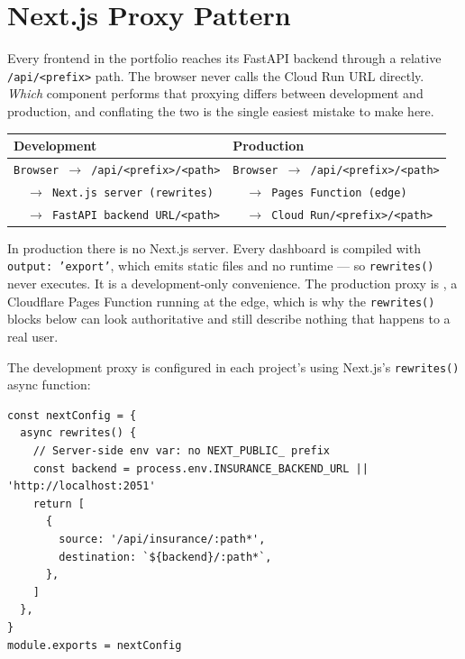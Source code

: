 \section{Next.js Proxy Pattern}
\label{sec:infra-proxy}


Every frontend in the portfolio reaches its FastAPI backend through a relative
\texttt{/api/<prefix>} path. The browser never calls the Cloud Run URL directly.
\emph{Which} component performs that proxying differs between development and
production, and conflating the two is the single easiest mistake to make here.

\begin{center}
\begin{tabular}{ll}
\toprule
\textbf{Development} & \textbf{Production} \\
\midrule
\texttt{Browser $\to$ /api/<prefix>/<path>} & \texttt{Browser $\to$ /api/<prefix>/<path>} \\
\texttt{$\quad\to$ Next.js server (rewrites)} & \texttt{$\quad\to$ Pages Function (edge)} \\
\texttt{$\quad\to$ FastAPI backend URL/<path>} & \texttt{$\quad\to$ Cloud Run/<prefix>/<path>} \\
\bottomrule
\end{tabular}
\end{center}

\begin{keyinsight}
In production there is no Next.js server. Every dashboard is compiled with
\texttt{output: 'export'}, which emits static files and no runtime --- so
\texttt{rewrites()} never executes. It is a development-only convenience. The
production proxy is , a Cloudflare Pages
Function running at the edge, which is why the \texttt{rewrites()} blocks below
can look authoritative and still describe nothing that happens to a real user.
\end{keyinsight}

The development proxy is configured in each project's  using Next.js's \texttt{rewrites()} async function:

\begin{lstlisting}[style=typescript, caption={next.config.js -- Insurance project (projects/01-.../next.config.js)}]
const nextConfig = {
  async rewrites() {
    // Server-side env var: no NEXT_PUBLIC_ prefix
    const backend = process.env.INSURANCE_BACKEND_URL || 'http://localhost:2051'
    return [
      {
        source: '/api/insurance/:path*',
        destination: `${backend}/:path*`,
      },
    ]
  },
}
module.exports = nextConfig
\end{lstlisting}


